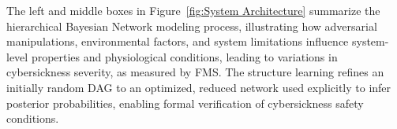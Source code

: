 \documentclass{vgtc}                          %
\begin{document}
The left and middle boxes in Figure~\ref{fig:System Architecture} summarize the hierarchical Bayesian Network modeling process, illustrating how adversarial manipulations, environmental factors, and system limitations influence system-level properties and physiological conditions, leading to variations in cybersickness severity, as measured by FMS. The structure learning refines an initially random DAG to an optimized, reduced network used explicitly to infer posterior probabilities, enabling formal verification of cybersickness safety conditions.





\end{document}
